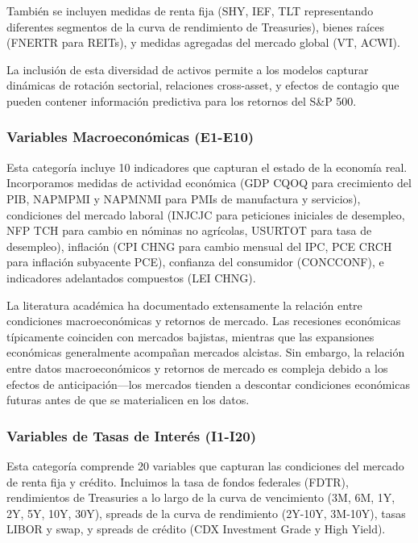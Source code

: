 \documentclass[11pt,a4paper]{article}
\begin{document}
También se incluyen medidas de renta fija (SHY, IEF, TLT representando diferentes segmentos de la curva de rendimiento de Treasuries), bienes raíces (FNERTR para REITs), y medidas agregadas del mercado global (VT, ACWI).

La inclusión de esta diversidad de activos permite a los modelos capturar dinámicas de rotación sectorial, relaciones cross-asset, y efectos de contagio que pueden contener información predictiva para los retornos del S\&P 500.

\subsubsection{Variables Macroeconómicas (E1-E10)}

Esta categoría incluye 10 indicadores que capturan el estado de la economía real. Incorporamos medidas de actividad económica (GDP CQOQ para crecimiento del PIB, NAPMPMI y NAPMNMI para PMIs de manufactura y servicios), condiciones del mercado laboral (INJCJC para peticiones iniciales de desempleo, NFP TCH para cambio en nóminas no agrícolas, USURTOT para tasa de desempleo), inflación (CPI CHNG para cambio mensual del IPC, PCE CRCH para inflación subyacente PCE), confianza del consumidor (CONCCONF), e indicadores adelantados compuestos (LEI CHNG).

La literatura académica ha documentado extensamente la relación entre condiciones macroeconómicas y retornos de mercado. Las recesiones económicas típicamente coinciden con mercados bajistas, mientras que las expansiones económicas generalmente acompañan mercados alcistas. Sin embargo, la relación entre datos macroeconómicos y retornos de mercado es compleja debido a los efectos de anticipación---los mercados tienden a descontar condiciones económicas futuras antes de que se materialicen en los datos.

\subsubsection{Variables de Tasas de Interés (I1-I20)}

Esta categoría comprende 20 variables que capturan las condiciones del mercado de renta fija y crédito. Incluimos la tasa de fondos federales (FDTR), rendimientos de Treasuries a lo largo de la curva de vencimiento (3M, 6M, 1Y, 2Y, 5Y, 10Y, 30Y), spreads de la curva de rendimiento (2Y-10Y, 3M-10Y), tasas LIBOR y swap, y spreads de crédito (CDX Investment Grade y High Yield).
\end{document}
